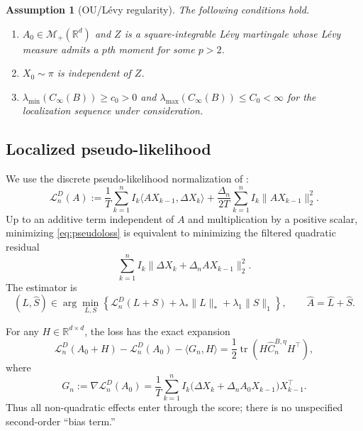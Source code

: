 \documentclass[12pt]{article}
\newtheorem{assumption}{Assumption}
\theoremstyle{definition}
\DeclareMathOperator{\tr}{tr}
\begin{document}
	\begin{assumption}[OU/L\'evy regularity]\label{ass:A0}
		The following conditions hold.
		\begin{enumerate}
			\item $A_0\in\mathcal M_+(\mathbb R^d)$ and $Z$ is a square-integrable L\'evy martingale whose L\'evy measure admits a $p$th moment for some $p>2$.
			\item $X_0\sim\pi$ is independent of $Z$.
			\item $\lambda_{\min}(C_\infty(B))\ge c_0>0$ and $\lambda_{\max}(C_\infty(B))\le C_0<\infty$ for the localization sequence under consideration.
		\end{enumerate}
	\end{assumption}
	
	\subsection{Localized pseudo-likelihood}
	
	We use the discrete pseudo-likelihood normalization of \citet{DexheimerJeszka2026}:
	\begin{equation}
		\mathcal L_n^D(A) :=\frac{1}{T}\sum_{k=1}^n I_k\langle AX_{k-1},\Delta X_k\rangle+\frac{\Delta_n}{2T}\sum_{k=1}^n I_k\|AX_{k-1}\|_2^2. \label{eq:pseudoloss}
	\end{equation}
	Up to an additive term independent of $A$ and multiplication by a positive scalar, minimizing \eqref{eq:pseudoloss} is equivalent to minimizing the filtered quadratic residual
	\[\sum_{k=1}^n I_k\|\Delta X_k+\Delta_n AX_{k-1}\|_2^2.\]
	The estimator is
	\begin{equation}
		(\widehat L,\widehat S) \in\arg\min_{L,S} \left\{\mathcal L_n^D(L+S)+\lambda_*\|L\|_*+\lambda_1\|S\|_1\right\}, \qquad \widehat A=\widehat L+\widehat S. \label{eq:estimator}
	\end{equation}
	
	For any $H\in\mathbb R^{d\times d}$, the loss has the exact expansion
	\begin{equation}
		\mathcal L_n^D(A_0+H)-\mathcal L_n^D(A_0)-\langle G_n,H\rangle=\frac{1}{2} \tr\!\left(H\widehat C_n^{B,\eta}H^\top\right), \label{eq:exactexpansion} \end{equation}
	where
	\begin{equation}
		G_n:=\nabla\mathcal L_n^D(A_0)=\frac{1}{T}\sum_{k=1}^n I_k \bigl(\Delta X_k+\Delta_nA_0X_{k-1}\bigr)X_{k-1}^\top. \label{eq:score}
	\end{equation}
	Thus all non-quadratic effects enter through the score; there is no unspecified second-order ``bias term.''
	
\end{document}
